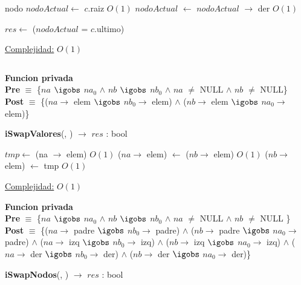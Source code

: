 \begin{Algoritmos}
\begin{algorithm}[H]
\begin{algorithmic}[1]
    \State nodo $nodoActual \gets$ $c$.raiz \Comment $O(1)$
        $nodoActual$ $\gets$ $nodoActual$ $\rightarrow$ der \Comment $O(1)$
    \EndWhile

    \State $res \gets$ ($nodoActual$ = $c$.ultimo)

    \medskip
    \Statex \underline{Complejidad:} $O(1)$
\end{algorithmic}
\end{algorithm}


$ $\newline

\textbf{Funcion privada}\\
\textbf{Pre} $\equiv$ \{$na$ $\igobs$ $na_0$ $\land$ $nb$ $\igobs$ $nb_0$ $\land$ $na$ $\neq$ NULL $\land$ $nb$ $\neq$ NULL\}\\%
\textbf{Post} $\equiv$ \{($na \to$ elem $\igobs$ $nb_0 \to$ elem) $\land$ ($nb \to$ elem $\igobs$ $na_0 \to$ elem)\}%
\begin{algorithm}[H]
{\textbf{iSwapValores}(, ) $\to$ $res$ : bool}
\begin{algorithmic}[1]

    \State $tmp \gets$ (na $\to$ elem) \Comment $O(1)$
    \State ($na \to$ elem) $\gets$ ($nb \to$ elem) \Comment $O(1)$
    \State ($nb \to$ elem) $\gets$ tmp \Comment $O(1)$

    \medskip
    \Statex \underline{Complejidad:} $O(1)$
\end{algorithmic}
\end{algorithm}


\textbf{Funcion privada}\\
\textbf{Pre} $\equiv$ \{$na$ $\igobs$ $na_0$ $\land$ $nb$ $\igobs$ $nb_0$ $\land$ $na$ $\neq$ NULL $\land$ $nb$ $\neq$ NULL \}\\%
\textbf{Post} $\equiv$ \{($na \to$ padre $\igobs$ $nb_0 \to$ padre) $\land$ ($nb \to$ padre $\igobs$ $na_0 \to$ padre) $\land$ ($na \to$ izq $\igobs$ $nb_0 \to$ izq) $\land$ ($nb \to$ izq $\igobs$ $na_0 \to$ izq) $\land$ ($na \to$ der $\igobs$ $nb_0 \to$ der) $\land$ ($nb \to$ der $\igobs$ $na_0 \to$ der)\}%
\begin{algorithm}[H]
{\textbf{iSwapNodos}(, ) $\to$ $res$ : bool}
\begin{algorithmic}[1]



\end{algorithmic}
\end{algorithm}
\end{Algoritmos}
